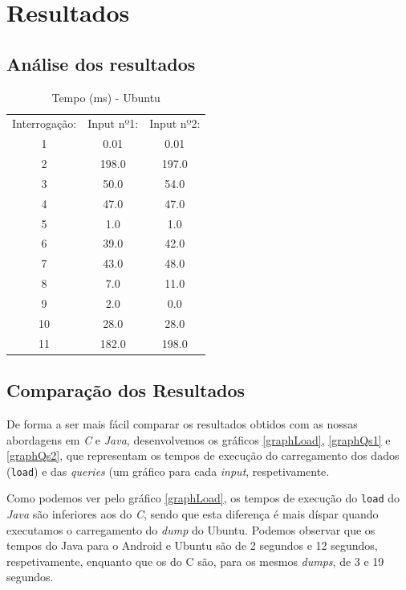 \documentclass[a4paper, 11pt, oneside]{article}
\begin{document}
\section{Resultados}

\subsection{Análise dos resultados}

\begin{table}[h] 
	\centering
	\caption{Tempo (ms) - Ubuntu}	
	\begin{tabular}{c|c|c}
	Interrogação: & Input nº1:      & Input nº2:      \\
	1             & 0.01            & 0.01            \\
	2             & 198.0           & 197.0           \\
	3             & 50.0            & 54.0            \\
	4             & 47.0            & 47.0            \\
	5             & 1.0             & 1.0             \\
	6             & 39.0            & 42.0            \\
	7             & 43.0            & 48.0            \\
	8             & 7.0             & 11.0            \\
	9             & 2.0             & 0.0             \\
	10            & 28.0            & 28.0            \\
	11            & 182.0           & 198.0  
	\end{tabular}
\end{table}



\subsection{Comparação dos Resultados}

De forma a ser mais fácil comparar os resultados obtidos com as nossas abordagens em \textit{C} e \textit{Java},
desenvolvemos os gráficos \ref{graphLoad}, \ref{graphQs1} e \ref{graphQs2}, que representam os tempos de execução do carregamento dos dados (\texttt{load}) e das \textit{queries} (um gráfico para cada \textit{input}, respetivamente.


Como podemos ver pelo gráfico \ref{graphLoad}, os tempos de execução do \texttt{load} do \textit{Java} são inferiores aos do \textit{C}, sendo que esta diferença é mais díspar quando executamos o carregamento do \textit{dump} do Ubuntu. Podemos observar que os tempos do Java para o Android e Ubuntu são de 2 segundos e 12 segundos, respetivamente, enquanto que os do C são, para os mesmos \textit{dumps}, de 3 e 19 segundos.
\end{document}
